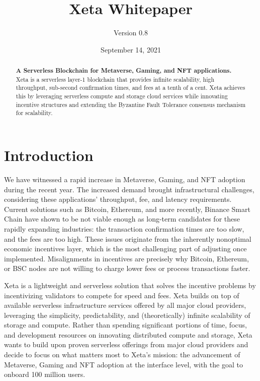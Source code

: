 \documentclass{article}
\title{Xeta Whitepaper}
\author{Version 0.8}
\date{September 14, 2021}
\begin{document}
\maketitle

\begin{abstract}
\textbf{A Serverless Blockchain for Metaverse, Gaming, and NFT applications.} Xeta is a serverless layer-1 blockchain that provides infinite scalability, high throughput, sub-second confirmation times, and fees at a tenth of a cent. Xeta achieves this by leveraging serverless compute and storage cloud services while innovating incentive structures and extending the Byzantine Fault Tolerance consensus mechanism for scalability.
\end{abstract}

\section{Introduction}

We have witnessed a rapid increase in Metaverse, Gaming, and NFT adoption during the recent year. The increased demand brought infrastructural challenges, considering these applications' throughput, fee, and latency requirements. Current solutions such as Bitcoin, Ethereum, and more recently, Binance Smart Chain have shown to be not viable enough as long-term candidates for these rapidly expanding industries: the transaction confirmation times are too slow, and the fees are too high. These issues originate from the inherently nonoptimal economic incentives layer, which is the most challenging part of adjusting once implemented. Misalignments in incentives are precisely why Bitcoin, Ethereum, or BSC nodes are not willing to charge lower fees or process transactions faster.
\bigskip

Xeta is a lightweight and serverless solution that solves the incentive problems by incentivizing validators to compete for speed and fees. Xeta builds on top of available serverless infrastructure services offered by all major cloud providers, leveraging the simplicity, predictability, and (theoretically) infinite scalability of storage and compute. Rather than spending significant portions of time, focus, and development resources on innovating distributed compute and storage, Xeta wants to build upon proven serverless offerings from major cloud providers and decide to focus on what matters most to Xeta's mission: the advancement of Metaverse, Gaming and NFT adoption at the interface level, with the goal to onboard 100 million users.
\bigskip
\end{document}
